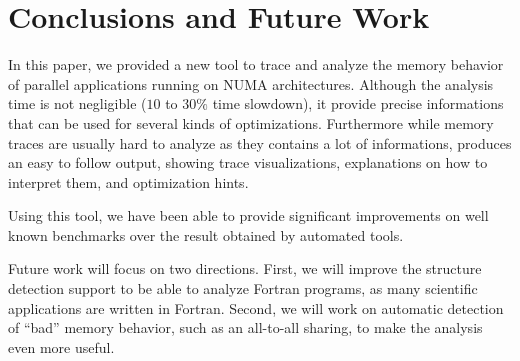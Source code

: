 
\section{Conclusions and Future Work}
\label{sec:concl}


In this paper, we provided a new tool to trace and analyze the memory
behavior of parallel applications running on NUMA architectures. Although the analysis time is not negligible ($10$ to $30\%$ time slowdown), it provide precise informations that can be used for several kinds of
optimizations. Furthermore while memory traces are usually hard to analyze as
they contains a lot of informations, \TABARNAC produces an easy to follow
output, showing trace visualizations, explanations on how to interpret
them, and optimization hints.

Using this tool, we have been able to provide significant improvements on
well known benchmarks over the result obtained by automated tools.

Future work will focus on two directions. First, we will improve the
structure detection support to be able to analyze Fortran programs, as many
scientific applications are written in Fortran. Second, we will work
on automatic detection of ``bad'' memory behavior, such as an all-to-all sharing,
to make the analysis even more useful.

